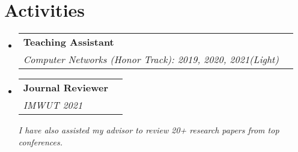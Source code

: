 \documentclass[a4paper,20pt]{article}
\makeatletter
\newcommand{\resumeSubheading}[4]{
  \vspace{-1pt}\item
    \begin{tabular*}{0.97\textwidth}{l@{\extracolsep{\fill}}r}
      \textbf{#1} & #2 \\
      \textit{#3} & \textit{#4} \\
    \end{tabular*}\vspace{-5pt}
}
\newcommand{\resumeSubHeadingListStart}{\begin{itemize}[leftmargin=*]}
\newcommand{\resumeSubHeadingListEnd}{\end{itemize}}
\makeatother
\begin{document}
\vspace{-5pt}
\section{Activities}
  \resumeSubHeadingListStart
    \resumeSubheading
    {Teaching Assistant}{}
    {Computer Networks (Honor Track): 2019, 2020, 2021(Light)}{}
    \resumeSubheading
    {Journal Reviewer}{}
    {IMWUT 2021}{}
    {\scriptsize \textit{ \footnotesize{\newline{}I have also assisted my advisor to review 20+ research papers from top conferences.}}}
\resumeSubHeadingListEnd
\end{document}
